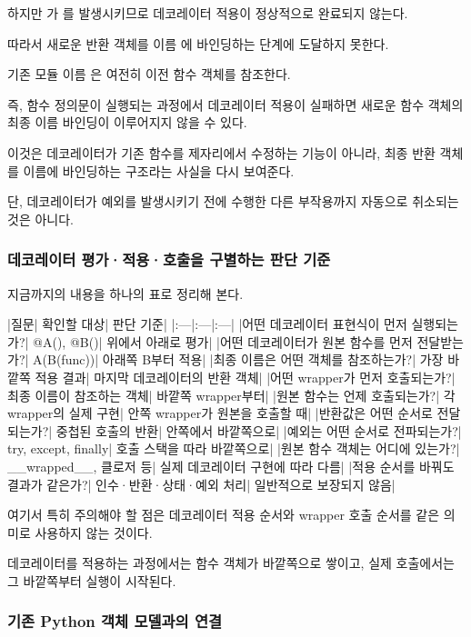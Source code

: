 하지만 가 를 발생시키므로 데코레이터 적용이 정상적으로 완료되지 않는다.

따라서 새로운 반환 객체를 이름 에 바인딩하는 단계에 도달하지 못한다.

기존 모듈 이름 은 여전히 이전 함수 객체를 참조한다.

즉, 함수 정의문이 실행되는 과정에서 데코레이터 적용이 실패하면 새로운 함수 객체의 최종 이름 바인딩이 이루어지지 않을 수 있다.

이것은 데코레이터가 기존 함수를 제자리에서 수정하는 기능이 아니라, 최종 반환 객체를 이름에 바인딩하는 구조라는 사실을 다시 보여준다.

단, 데코레이터가 예외를 발생시키기 전에 수행한 다른 부작용까지 자동으로 취소되는 것은 아니다.

\subsubsection{데코레이터 평가·적용·호출을 구별하는 판단 기준}

지금까지의 내용을 하나의 표로 정리해 본다.

\begin{dhktable}
|질문|	확인할 대상|	판단 기준|
|:---|:---|:---|
|어떤 데코레이터 표현식이 먼저 실행되는가?|	@A(), @B()|	위에서 아래로 평가|
|어떤 데코레이터가 원본 함수를 먼저 전달받는가?|	A(B(func))|	아래쪽 B부터 적용|
|최종 이름은 어떤 객체를 참조하는가?|	가장 바깥쪽 적용 결과|	마지막 데코레이터의 반환 객체|
|어떤 wrapper가 먼저 호출되는가?|	최종 이름이 참조하는 객체|	바깥쪽 wrapper부터|
|원본 함수는 언제 호출되는가?|	각 wrapper의 실제 구현|	안쪽 wrapper가 원본을 호출할 때|
|반환값은 어떤 순서로 전달되는가?|	중첩된 호출의 반환|	안쪽에서 바깥쪽으로|
|예외는 어떤 순서로 전파되는가?|	try, except, finally|	호출 스택을 따라 바깥쪽으로|
|원본 함수 객체는 어디에 있는가?|	__wrapped__, 클로저 등|	실제 데코레이터 구현에 따라 다름|
|적용 순서를 바꿔도 결과가 같은가?|	인수·반환·상태·예외 처리|	일반적으로 보장되지 않음|
\end{dhktable}

여기서 특히 주의해야 할 점은 데코레이터 적용 순서와 wrapper 호출 순서를 같은 의미로 사용하지 않는 것이다.

데코레이터를 적용하는 과정에서는 함수 객체가 바깥쪽으로 쌓이고, 실제 호출에서는 그 바깥쪽부터 실행이 시작된다.

\subsubsection{기존 Python 객체 모델과의 연결}

